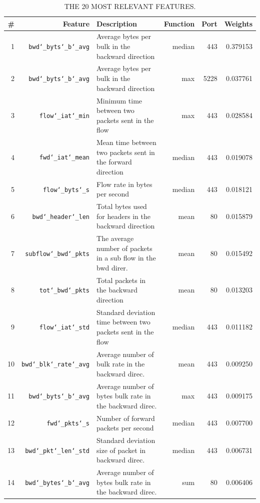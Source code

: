 \begin{table}[ht]
  \caption{THE 20 MOST RELEVANT FEATURES.}
  \centering
  \begin{small}
    \begin{tabular}{rrlrrr}   \hline
 \# & Feature & Description & Function & Port &  Weights  \\ \hline

	1 &  \texttt{bwd\char`_byts\char`_b\char`_avg} &Average bytes per bulk in the backward direction & median & 443& 0.379153\\ 
	2 &  \texttt{bwd\char`_byts\char`_b\char`_avg} &  Average bytes per bulk in the backward direction &  max & 5228& 0.037761\\
	3 & \texttt{flow\char`_iat\char`_min} & Minimum time between two packets sent in the flow & max  & 443 &0.028584\\ 
	4 & \texttt{fwd\char`_iat\char`_mean} & Mean time between two packets sent in the forward direction & median & 443 &0.019078\\ 
	5 & \texttt{flow\char`_byts\char`_s} & Flow rate in bytes per second & median  & 443&0.018121\\
	6 & \texttt{bwd\char`_header\char`_len} & Total bytes used for headers in the backward direction &  mean  & 80& 0.015879\\ 
	7 &  \texttt{subflow\char`_bwd\char`_pkts} & The average number of packets in a sub flow in the bwd direr. &  mean  & 80&0.015492\\ 
	8 & \texttt{tot\char`_bwd\char`_pkts} & Total packets in the backward direction & mean  & 80 &0.013203\\ 
	9 & \texttt{flow\char`_iat\char`_std} & Standard deviation time between two packets sent in the flow &median & 443 &0.011182\\ 
	10 &  \texttt{bwd\char`_blk\char`_rate\char`_avg} & Average number of bulk rate in the backward direc. &  mean  & 443&0.009250\\ 
	11 & \texttt{bwd\char`_byts\char`_b\char`_avg} & Average number of bytes bulk rate in the backward direc. & max  & 443&0.009175\\
	12 & \texttt{fwd\char`_pkts\char`_s} & Number of forward packets per second & median  & 443&0.007700\\
	13 & \texttt{bwd\char`_pkt\char`_len\char`_std} & Standard deviation size of packet in backward direc. & median  & 443&0.006731\\ 
	14 & \texttt{bwd\char`_bytes\char`_b\char`_avg} & Average number of bytes bulk rate in the backward direc. & sum  & 80&0.006406\\ 

\end{tabular}
\end{small}
\end{table}
